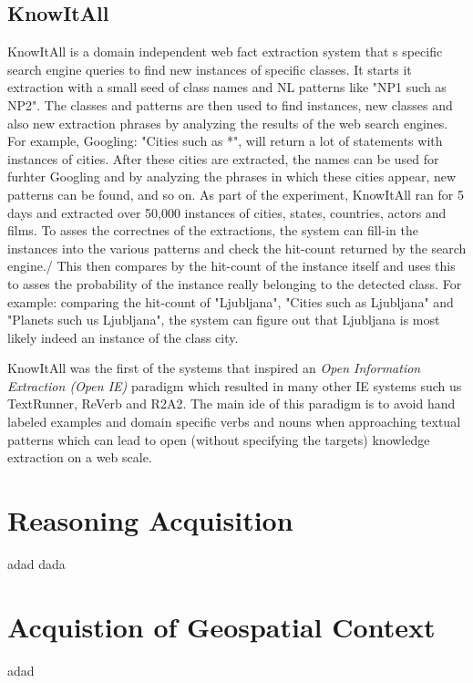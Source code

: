 \subsection{KnowItAll}
\label{section:rw_KnowItAll}
KnowItAll\parencite{Etzioni2004} is a domain independent web fact extraction 
system that s specific search engine queries to find new instances of specific
classes. It starts it extraction with a small seed of class names and NL patterns
like "NP1 such as NP2". The classes and patterns are then used to find instances,
new classes and also new extraction phrases by analyzing the results of the 
web search engines. For example, Googling: "Cities such as *", will return 
a lot of statements with instances of cities. After these cities are extracted,
the names can be used for furhter Googling and by analyzing the phrases in which
these cities appear, new patterns can be found, and so on. As part of the
experiment, KnowItAll ran for 5 days and extracted over 50,000 instances of
cities, states, countries, actors and films.
To asses the correctnes of the extractions, the system can fill-in the instances
into the various patterns and check the hit-count returned by the search engine./
This then compares by the hit-count of the instance itself and uses this to
asses the probability of the instance really belonging to the detected class.
For example: comparing the hit-count of "Ljubljana", "Cities such as Ljubljana"
and "Planets such us Ljubljana", the system can figure out that Ljubljana is
most likely indeed an instance of the class city.

KnowItAll was the first of the systems that inspired an \emph{Open Information
Extraction (Open IE)} paradigm\parencite{Etzioni2011} which resulted in many 
other IE systems such us TextRunner, ReVerb and R2A2. The main ide of this
paradigm is to avoid hand labeled examples and domain specific verbs and nouns
when approaching textual patterns which can lead to open (without specifying the
targets) knowledge extraction on a web scale.

\section{Reasoning Acquisition}
adad dada



\section{Acquistion of Geospatial Context}
adad
